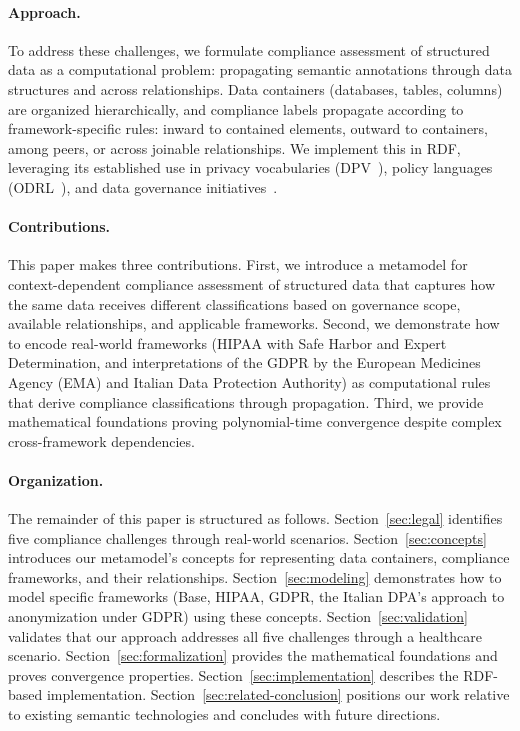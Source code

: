 \documentclass{IOS-Book-Article}
\begin{document}
\paragraph{Approach.}
To address these challenges, we formulate compliance assessment of structured data as a computational problem: propagating semantic annotations through data structures and across relationships. Data containers (databases, tables, columns) are organized hierarchically, and compliance labels propagate according to framework-specific rules: inward to contained elements, outward to containers, among peers, or across joinable relationships. We implement this in RDF, leveraging its established use in privacy vocabularies (DPV~\cite{pandit2019dpv}), policy languages (ODRL~\cite{odrl-model-2018,odrl-vocab-2018}), and data governance initiatives~\cite{bader2020}.


\paragraph{Contributions.}
This paper makes three contributions. First, we introduce a metamodel for context-dependent compliance assessment of structured data that captures how the same data receives different classifications based on governance scope, available relationships, and applicable frameworks. Second, we demonstrate how to encode real-world frameworks (HIPAA with Safe Harbor and Expert Determination, and interpretations of the GDPR by the European Medicines Agency (EMA) and Italian Data Protection Authority) as computational rules that derive compliance classifications through propagation. Third, we provide mathematical foundations proving polynomial-time convergence despite complex cross-framework dependencies.

\paragraph{Organization.}
The remainder of this paper is structured as follows. Section~\ref{sec:legal} identifies five compliance challenges through real-world scenarios. Section~\ref{sec:concepts} introduces our metamodel's concepts for representing data containers, compliance frameworks, and their relationships. Section~\ref{sec:modeling} demonstrates how to model specific frameworks (Base, HIPAA, GDPR, the Italian DPA's approach to anonymization under GDPR) using these concepts. Section~\ref{sec:validation} validates that our approach addresses all five challenges through a healthcare scenario. Section~\ref{sec:formalization} provides the mathematical foundations and proves convergence properties. Section~\ref{sec:implementation} describes the RDF-based implementation. Section~\ref{sec:related-conclusion} positions our work relative to existing semantic technologies and concludes with future directions.
\end{document}
